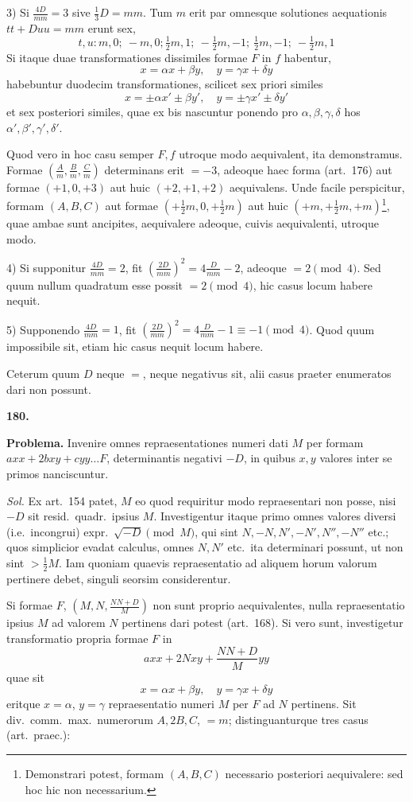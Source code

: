 \documentclass[12pt,a4paper]{article}
\theoremstyle{plain}
\theoremstyle{definition}
\theoremstyle{remark}
\begin{document}
3) Si $\frac{4D}{mm}=3$ sive $\frac{1}{3}D=mm$. Tum $m$ erit par omnesque solutiones aequationis $tt+Duu=mm$ erunt sex,
\[t,u: m,0;\ -m,0; \tfrac{1}{2}m,1;\ -\tfrac{1}{2}m,-1;\ \tfrac{1}{2}m,-1;\ -\tfrac{1}{2}m,1\]
Si itaque duae transformationes dissimiles formae $F$ in $f$ habentur,
\[x=\alpha x+\beta y,\quad y=\gamma x+\delta y\]
habebuntur duodecim transformationes, scilicet sex priori similes
\[x=\pm\alpha x'\pm\beta y',\quad y=\pm\gamma x'\pm\delta y'\]
et sex posteriori similes, quae ex bis nascuntur ponendo pro $\alpha,\beta,\gamma,\delta$ hos $\alpha',\beta',\gamma',\delta'$.

Quod vero in hoc casu semper $F,f$ utroque modo aequivalent, ita demonstramus. Formae $(\frac{A}{m},\frac{B}{m},\frac{C}{m})$ determinans erit $=-3$, adeoque haec forma (art.\ 176) aut formae $(+1,0,+3)$ aut huic $(+2,+1,+2)$ aequivalens. Unde facile perspicitur, formam $(A,B,C)$ aut formae $(+\frac{1}{2}m,0,+\frac{1}{2}m)$ aut huic $(+m,+\frac{1}{2}m,+m)$\footnote{Demonstrari potest, formam $(A,B,C)$ necessario posteriori aequivalere: sed hoc hic non necessarium.}, quae ambae sunt ancipites, aequivalere adeoque, cuivis aequivalenti, utroque modo.

4) Si supponitur $\frac{4D}{mm}=2$, fit $(\frac{2D}{mm})^2=4\frac{D}{mm}-2$, adeoque $=2\pmod{4}$. Sed quum nullum quadratum esse possit $=2\pmod{4}$, hic casus locum habere nequit.

5) Supponendo $\frac{4D}{mm}=1$, fit $(\frac{2D}{mm})^2=4\frac{D}{mm}-1\equiv -1\pmod{4}$. Quod quum impossibile sit, etiam hic casus nequit locum habere.

Ceterum quum $D$ neque $=$, neque negativus sit, alii casus praeter enumeratos dari non possunt.

\textbf{180.}

\textbf{Problema.} Invenire omnes repraesentationes numeri dati $M$ per formam $axx+2bxy+cyy\ldots F$, determinantis negativi $-D$, in quibus $x,y$ valores inter se primos nanciscuntur.

\textit{Sol.} Ex art.\ 154 patet, $M$ eo quod requiritur modo repraesentari non posse, nisi $-D$ sit resid.\ quadr.\ ipsius $M$. Investigentur itaque primo omnes valores diversi (i.e.\ incongrui) expr.\ $\sqrt{-D}\pmod{M}$, qui sint $N,-N,N',-N',N'',-N''$ etc.; quos simplicior evadat calculus, omnes $N,N'$ etc.\ ita determinari possunt, ut non sint $>\frac{1}{2}M$. Iam quoniam quaevis repraesentatio ad aliquem horum valorum pertinere debet, singuli seorsim considerentur.

Si formae $F$, $(M,N,\frac{NN+D}{M})$ non sunt proprio aequivalentes, nulla repraesentatio ipsius $M$ ad valorem $N$ pertinens dari potest (art.\ 168). Si vero sunt, investigetur transformatio propria formae $F$ in
\[axx+2Nxy+\frac{NN+D}{M}yy\]
quae sit
\[x=\alpha x+\beta y,\quad y=\gamma x+\delta y\]
eritque $x=\alpha$, $y=\gamma$ repraesentatio numeri $M$ per $F$ ad $N$ pertinens. Sit div.\ comm.\ max.\ numerorum $A,2B,C$, $=m$; distinguanturque tres casus (art.\ praec.):
\end{document}
